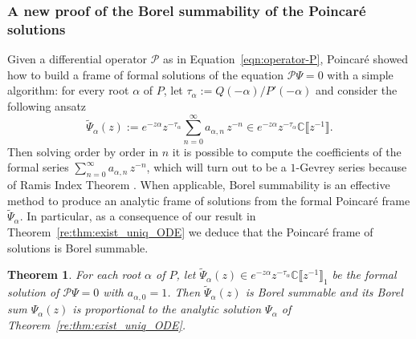\documentclass{article}
\newcommand{\C}{\mathbb{C}}
\newcommand{\series}[1]{\tilde{#1}}
\theoremstyle{definition}
\theoremstyle{plain}
\newtheorem{theorem}{Theorem}[section]
\begin{document}
\subsubsection{A new proof of the Borel summability of the Poincar\'{e} solutions}\label{sec:new-summability-proof}
Given a differential operator $\mathcal{P}$ as in Equation~\eqref{eqn:operator-P}, Poincar\'e showed how to build a frame of formal solutions of the equation $\mathcal{P}\Psi=0$ with a simple algorithm: for every root $\alpha$ of $P$, let $\tau_\alpha:=Q(-\alpha)/P'(-\alpha)$ and consider the following ansatz
\begin{equation}
    \tilde{\Psi}_\alpha(z):=e^{-z\alpha}z^{-\tau_\alpha}\sum_{n=0}^\infty a_{\alpha,n}\, z^{-n}\in e^{-z\alpha} z^{-\tau_\alpha}\C\llbracket z^{-1}\rrbracket.
\end{equation}
Then solving order by order in $n$ it is possible to compute the coefficients of the formal series $\sum_{n=0}^\infty a_{\alpha,n}\, z^{-n}$, which will turn out to be a $1$-Gevrey series because of Ramis
Index Theorem \cite{ramis_index}. When applicable, Borel summability is an effective method to produce an analytic frame of solutions from the formal Poincar\'e frame $\tilde{\Psi}_\alpha$. In particular, as a consequence of our result in Theorem~\ref{re:thm:exist_uniq_ODE} we deduce that the Poincar\'e frame of solutions is Borel summable.
\begin{theorem}\label{thm2-dim}
For each root $\alpha$ of $P$, let $\tilde{\Psi}_\alpha(z)\in e^{-z\alpha} z^{-\tau_\alpha}\C\llbracket z^{-1}\rrbracket_1$ be the formal solution of $\mathcal{P}\Psi=0$ with $a_{\alpha,0}=1$. Then $\series{\Psi}_\alpha(z)$ is Borel summable and its Borel sum $\hat{\Psi}_\alpha(z)$ is proportional to the analytic solution $\Psi_\alpha$ of Theorem~\ref{re:thm:exist_uniq_ODE}. 
\end{theorem}
\end{document}
